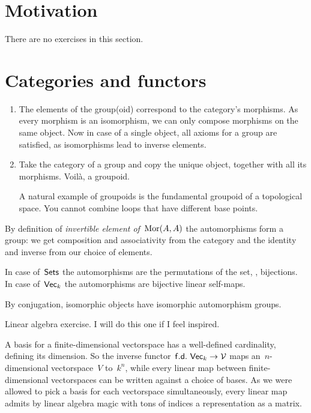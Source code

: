 \section{Motivation}

There are no exercises in this section.


\section{Categories and functors}

\begin{exercise}
  \begin{enumerate}
    \item The elements of the group(oid) correspond to the category's morphisms. As every morphism is an isomorphism, we can only compose morphisms on the same object. Now in case of a single object, all axioms for a group are satisfied, as isomorphisms lead to inverse elements.

    \item Take the category of a group and copy the unique object, together with all its morphisms. Voil\`a, a groupoid.

      A natural example of groupoids is the fundamental groupoid of a topological space. You cannot combine loops that have different base points.
  \end{enumerate}
\end{exercise}

\begin{exercise}
  By definition of \emph{invertible element of~$\operatorname{Mor}(A,A)$} the automorphisms form a group: we get composition and associativity from the category and the identity and inverse from our choice of elements.
  
  In case of~$\mathsf{Sets}$ the automorphisms are the permutations of the set, \ie, bijections. In case of~$\mathsf{Vec}_k$ the automorphisms are bijective linear self-maps.

  By conjugation, isomorphic objects have isomorphic automorphism groups.
\end{exercise}

\begin{exercise}
  \label{exercise:22c}
  Linear algebra exercise. I will do this one if I feel inspired.
\end{exercise}

\begin{exercise}
  A basis for a finite-dimensional vectorspace has a well-defined cardinality, defining its dimension. So the inverse functor~$\mathsf{f.d.\ Vec}_k\to\mathcal{V}$ maps an~$n$\nobreakdash-dimensional vectorspace~$V$ to~$k^n$, while every linear map between finite-dimensional vectorspaces can be written against a choice of bases. As we were allowed to pick a basis for each vectorspace simultaneously, every linear map admits by linear algebra magic with tons of indices a representation as a matrix.
\end{exercise}


